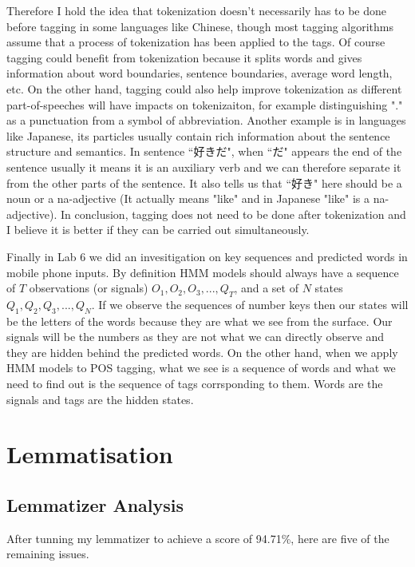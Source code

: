 \documentclass[11pt]{article} %
\begin{document}
Therefore I hold the idea that tokenization doesn't necessarily has to be done before tagging in some languages like Chinese, though most tagging algorithms assume that a process of tokenization has been applied to the tags\cite[157]{JurafskyMartin200805}. Of course tagging could benefit from tokenization because it splits words and gives information about word boundaries, sentence boundaries, average word length, etc. On the other hand, tagging could also help improve tokenization as different part-of-speeches will have impacts on tokenizaiton, for example distinguishing "." as a punctuation from a symbol of abbreviation. Another example is in languages like Japanese, its particles usually contain rich information about the sentence structure and semantics. In sentence ``好きだ", when ``だ" appears the end of the sentence usually it means it is an auxiliary verb and we can therefore separate it from the other parts of the sentence. It also tells us that ``好き" here should be a noun or a na-adjective (It actually means "like" and in Japanese "like" is a na-adjective). In conclusion, tagging does not need to be done after tokenization and I believe it is better if they can be carried out simultaneously.

Finally in Lab 6 we did an invesitigation on key sequences and predicted words in mobile phone inputs. By definition HMM models should always have a sequence of $T$ observations (or signals) $O_1, O_2, O_3, ..., Q_T$, and a set of $N$ states $Q_1, Q_2, Q_3, ..., Q_N$\cite[177]{JurafskyMartin200805}. If we observe the sequences of number keys then our states will be the letters of the words because they are what we see from the surface. Our signals will be the numbers as they are not what we can directly observe and they are hidden behind the predicted words. On the other hand, when we apply HMM models to POS tagging, what we see is a sequence of words and what we need to find out is the sequence of tags corrsponding to them. Words are the signals and tags are the hidden states.

\section{Lemmatisation}

\subsection{Lemmatizer Analysis}
After tunning my lemmatizer to achieve a score of 94.71\%, here are five of the remaining issues.
\end{document}
